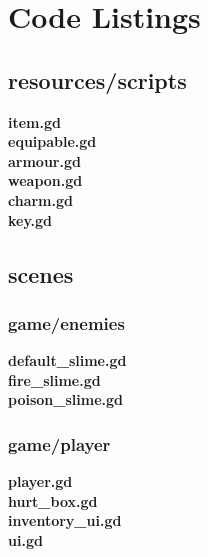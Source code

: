 \documentclass{article}
\begin{document}
\newpage
{}
\section{Code Listings}
\subsection{resources/scripts}
\textbf{item.gd}\\

\textbf{equipable.gd}\\

\textbf{armour.gd}\\

\textbf{weapon.gd}\\

\textbf{charm.gd}\\

\newpage
\textbf{key.gd}\\

\subsection{scenes}
\subsubsection{game/enemies}
\textbf{default\_slime.gd}\\

\textbf{fire\_slime.gd}\\

\textbf{poison\_slime.gd}\\

\subsubsection{game/player}
\textbf{player.gd}\\

\textbf{hurt\_box.gd}\\

\textbf{inventory\_ui.gd}\\

\textbf{ui.gd}\\

\end{document}
